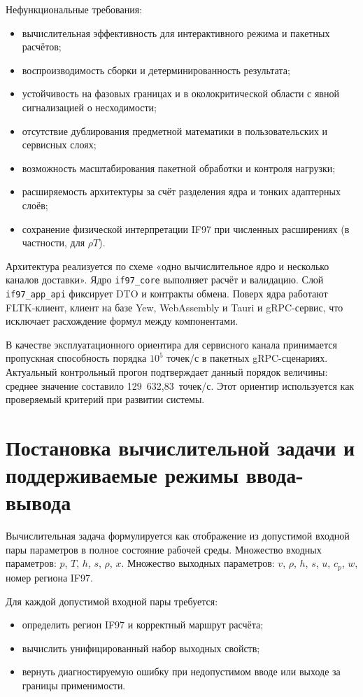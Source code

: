 Нефункциональные требования:
\begin{itemize}
\item вычислительная эффективность для интерактивного режима и пакетных расчётов;
\item воспроизводимость сборки и детерминированность результата;
\item устойчивость на фазовых границах и в околокритической области с явной сигнализацией о несходимости;
\item отсутствие дублирования предметной математики в пользовательских и сервисных слоях;
\item возможность масштабирования пакетной обработки и контроля нагрузки;
\item расширяемость архитектуры за счёт разделения ядра и тонких адаптерных слоёв;
\item сохранение физической интерпретации IF97 при численных расширениях (в частности, для $\rho T$).
\end{itemize}

Архитектура реализуется по схеме «одно вычислительное ядро и несколько каналов доставки».
Ядро \texttt{if97\_core} выполняет расчёт и валидацию.
Слой \texttt{if97\_app\_api} фиксирует DTO и контракты обмена.
Поверх ядра работают FLTK-клиент,
клиент на базе Yew, WebAssembly и Tauri
и gRPC-сервис,
что исключает расхождение формул между компонентами.

В качестве эксплуатационного ориентира для сервисного канала принимается
пропускная способность порядка $10^5$ точек/с
в пакетных gRPC-сценариях.
Актуальный контрольный прогон
подтверждает данный порядок величины:
среднее значение составило 129~632,83~точек/с.
Этот ориентир используется как проверяемый критерий при развитии системы.

\section{Постановка вычислительной задачи и поддерживаемые режимы ввода-вывода}

Вычислительная задача формулируется как отображение
из допустимой входной пары параметров в полное состояние рабочей среды.
Множество входных параметров: $p$, $T$, $h$, $s$, $\rho$, $x$.
Множество выходных параметров: $v$, $\rho$, $h$, $s$, $u$, $c_p$, $w$, номер региона IF97.

Для каждой допустимой входной пары требуется:
\begin{itemize}
\item определить регион IF97 и корректный маршрут расчёта;
\item вычислить унифицированный набор выходных свойств;
\item вернуть диагностируемую ошибку при недопустимом вводе или выходе за границы применимости.
\end{itemize}


